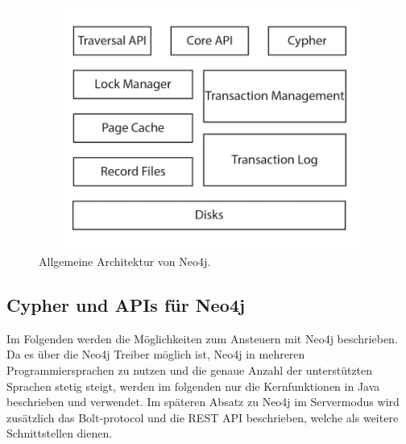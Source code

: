 \begin{figure}[H]
	\centering
	\includegraphics [width=12cm, height=8cm]{Figures/Architecture}
	\caption[Architecture]{Allgemeine Architektur von Neo4j.}
	\label{fig:Architecure}
\end{figure}

\subsection{Cypher und APIs für Neo4j}
Im Folgenden werden die Möglichkeiten zum Ansteuern mit Neo4j beschrieben. Da es über die Neo4j Treiber möglich ist, Neo4j in mehreren Programmiersprachen zu nutzen und die genaue Anzahl der unterstützten Sprachen stetig steigt, werden im folgenden nur die Kernfunktionen in Java beschrieben und verwendet. Im späteren Absatz zu Neo4j im Servermodus wird zusätzlich das Bolt-protocol und die REST API beschrieben, welche als weitere Schnittstellen dienen.

